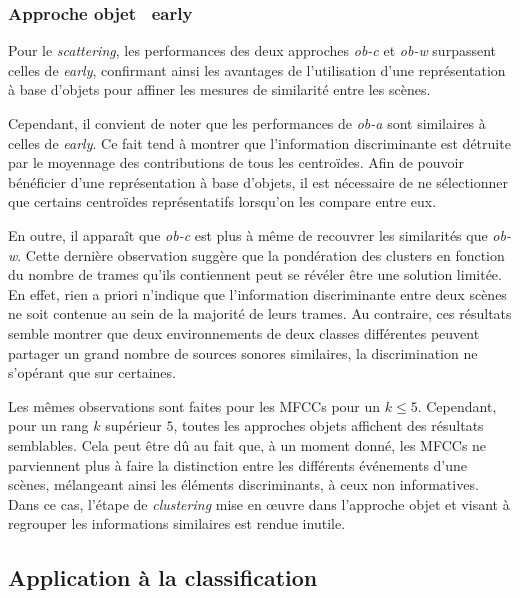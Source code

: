\subsubsection{Approche objet \vs~early}

Pour le \emph{scattering}, les performances des deux approches \emph{ob-c} et \emph{ob-w} surpassent celles de \emph{early}, confirmant ainsi les avantages de l'utilisation d'une représentation à base d'objets pour affiner les mesures de similarité entre les scènes. 

Cependant, il convient de noter que les performances de \emph{ob-a} sont similaires à celles de \emph{early}. Ce fait tend à montrer que l'information discriminante est détruite par le moyennage des contributions de tous les centroïdes. Afin de pouvoir bénéficier d'une représentation à base d'objets, il est nécessaire de ne sélectionner que certains centroïdes représentatifs lorsqu'on les compare entre eux.

En outre, il apparaît que \emph{ob-c} est plus à même de recouvrer les similarités que \emph{ob-w}. Cette dernière observation suggère que la pondération des clusters en fonction du nombre de trames qu'ils contiennent peut se révéler être une solution limitée. En effet, rien a priori n'indique que l'information discriminante entre deux scènes ne soit contenue au sein de la majorité de leurs trames. Au contraire, ces résultats semble montrer que deux environnements de deux classes différentes peuvent partager un grand nombre de sources sonores similaires, la discrimination ne s'opérant que sur certaines.

Les mêmes observations sont faites pour les MFCCs pour un $k\leq5$. Cependant, pour un rang $k$ supérieur $5$, toutes les approches objets affichent des résultats semblables. Cela peut être dû au fait que, à un moment donné, les MFCCs ne parviennent plus à faire la distinction entre les différents événements d'une scènes, mélangeant ainsi les éléments discriminants, à ceux non informatives. Dans ce cas, l'étape de \emph{clustering} mise en œuvre dans l'approche objet et visant à regrouper les informations similaires  est rendue inutile.

\subsection{Application à la classification}





